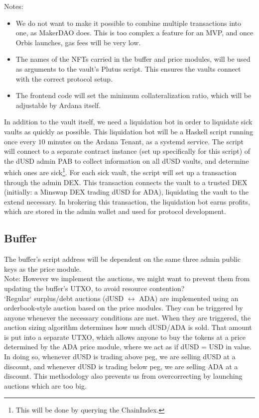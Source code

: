 \documentclass{article} %
\begin{document}
Notes:
\begin{itemize}
  \item We do not want to make it possible to combine multiple transactions into
    one, as MakerDAO does.
    This is too complex a feature for an MVP, and once Orbis launches, gas fees
    will be very low.
  \item The names of the NFTs carried in the buffer and price modules, will be
    used as arguments to the vault's Plutus script.
    This ensures the vaults connect with the correct protocol setup.
  \item The frontend code will set the minimum collateralization ratio, which
    will be adjustable by Ardana itself.
\end{itemize}

In addition to the vault itself, we need a liquidation bot in order to liquidate
sick vaults as quickly as possible.
This liquidation bot will be a Haskell script running once every $10$ minutes on
the Ardana Tenant, as a systemd service.
The script will connect to a separate contract instance (set up specifically for
this script) of the dUSD admin PAB to collect information on all dUSD vaults,
and determine which ones are sick\footnote{
  This will be done by querying the ChainIndex.
}.
For each sick vault, the script will set up a transaction through the admin DEX.
This transaction connects the vault to a trusted DEX (initially: a Minswap DEX
trading dUSD for ADA), liquidating the vault to the extend necessary.
In brokering this transaction, the liquidation bot earns profits, which are
stored in the admin wallet and used for protocol development.

\subsection{Buffer}
The buffer's script address will be dependent on the same three admin public
keys as the price module. \\

Note: However we implement the auctions, we might want to prevent them from
updating the buffer's UTXO, to avoid resource contention? \\

`Regular` surplus/debt auctions (dUSD $\leftrightarrow$ ADA) are implemented
using an orderbook-style auction based on the price modules.
They can be triggered by anyone whenever the necessary conditions are met.
When they are triggered, the auction sizing algorithm determines how much
dUSD/ADA is sold.
That amount is put into a separate UTXO, which allows anyone to buy the tokens
at a price determined by the ADA price module, where we act as if dUSD = USD in
value.
In doing so, whenever dUSD is trading above peg, we are selling dUSD at a
discount, and whenever dUSD is trading below peg, we are selling ADA at a
discount.
This methodology also prevents us from overcorrecting by launching auctions
which are too big. \\
\end{document}
